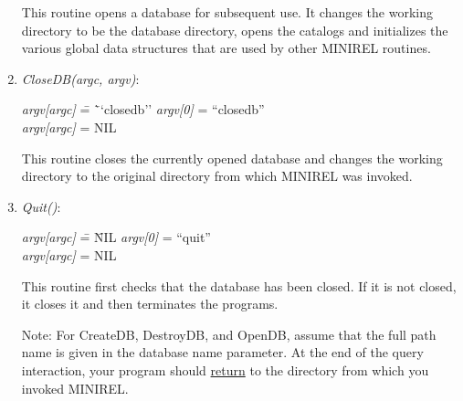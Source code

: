 \begin{enumerate}
This routine opens a database for subsequent use. It  changes the
working directory to be the database directory, opens the catalogs and
initializes the various global data structures that are used by other
MINIREL routines.

\item\emph{CloseDB(argc, argv)}:
\begin{tabbing}
\hspace*{0.2in}\emph{argv[argc]} \= = \= ``closedb'' \kill
\hspace*{0.2in}\emph{argv[0]}    \> = \> ``closedb'' \\
\hspace*{0.2in}\emph{argv[argc]} \> = \> NIL
\end{tabbing}

This routine closes the currently opened database and changes
the working directory to the original directory from which MINIREL
was invoked.

\item\emph{Quit()}:
\begin{tabbing}
\hspace*{0.2in}\emph{argv[argc]} \= = \= NIL      \kill
\hspace*{0.2in}\emph{argv[0]}    \> = \> ``quit'' \\
\hspace*{0.2in}\emph{argv[argc]} \> = \> NIL
\end{tabbing}

This routine first checks that the database has been closed.  If
it is not closed, it closes it and then terminates the programs.


Note: For CreateDB, DestroyDB, and OpenDB, assume that the full path
name is given in the database name parameter.  At the end of the query
interaction, your program should \underline{return}
to the directory from which you invoked MINIREL.


\end{enumerate}
